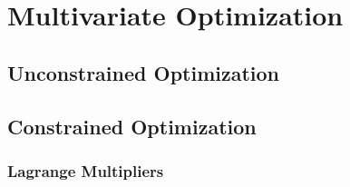 \section{Multivariate Optimization} 

\subsection{Unconstrained Optimization} 




\subsection{Constrained Optimization} 

\subsubsection{Lagrange Multipliers}


\begin{comment}

-unconstrained (gradient must be zero)
-constrained (Lagrange multipliers)
-maybe constrained linear optimization (simplex algorithm)
-maybe numerics (gradient descent and co.)...maybe numerical methods should generally be embedded in the respective topics?

\end{comment} 
